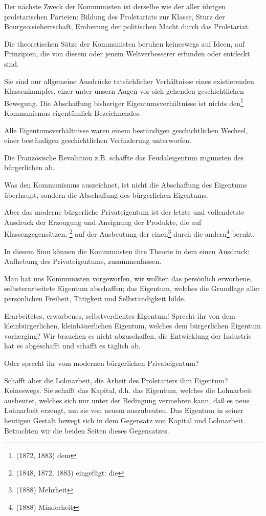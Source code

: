 \documentclass[letterpaper]{article}
\begin{document}
Der nächste Zweck der Kommunisten ist derselbe wie der aller übrigen proletarischen Parteien: Bildung des Proletariats zur Klasse, Sturz der Bourgeoisieherrschaft, Eroberung der politischen Macht durch das Proletariat.

Die theoretischen Sätze der Kommunisten beruhen keineswegs auf Ideen, auf Prinzipien, die von diesem oder jenem Weltverbesserer erfunden oder entdeckt sind.

Sie sind nur allgemeine Ausdrücke tatsächlicher Verhältnisse eines existierenden Klassenkampfes, einer unter unsern Augen vor sich gehenden geschichtlichen Bewegung. Die Abschaffung bisheriger Eigentumsverhältnisse ist nichts den\footnote{(1872, 1883) dem} Kommunismus eigentümlich Bezeichnendes.

Alle Eigentumsverhältnisse waren einem beständigen geschichtlichen Wechsel, einer beständigen geschichtlichen Veränderung unterworfen.

Die Französische Revolution z.B. schaffte das Feudaleigentum zugunsten des bürgerlichen ab.

Was den Kommunismus auszeichnet, ist nicht die Abschaffung des Eigentums überhaupt, sondern die Abschaffung des bürgerlichen Eigentums.

Aber das moderne bürgerliche Privateigentum ist der letzte und vollendetste Ausdruck der Erzeugung und Aneignung der Produkte, die auf Klassengegensätzen, \footnote{(1848, 1872, 1883) eingefügt: die} auf der Ausbeutung der einen\footnote{(1888) Mehrheit} durch die andern\footnote{(1888) Minderheit} beruht.

In diesem Sinn können die Kommunisten ihre Theorie in dem einen Ausdruck: Aufhebung des Privateigentums, zusammenfassen.

Man hat uns Kommunisten vorgeworfen, wir wollten das persönlich erworbene, selbsterarbeitete Eigentum abschaffen; das Eigentum, welches die Grundlage aller persönlichen Freiheit, Tätigkeit und Selbständigkeit bilde.

Erarbeitetes, erworbenes, selbstverdientes Eigentum! Sprecht ihr von dem kleinbürgerlichen, kleinbäuerlichen Eigentum, welches dem bürgerlichen Eigentum vorherging? Wir brauchen es nicht abzuschaffen, die Entwicklung der Industrie hat es abgeschafft und schafft es täglich ab.

Oder sprecht ihr vom modernen bürgerlichen Privateigentum?

Schafft aber die Lohnarbeit, die Arbeit des Proletariers ihm Eigentum? Keineswegs. Sie schafft das Kapital, d.h. das Eigentum, welches die Lohnarbeit ausbeutet, welches sich nur unter der Bedingung vermehren kann, daß es neue Lohnarbeit erzeugt, um sie von neuem auszubeuten. Das Eigentum in seiner heutigen Gestalt bewegt sich in dem Gegensatz von Kapital und Lohnarbeit. Betrachten wir die beiden Seiten dieses Gegensatzes.
\end{document}
